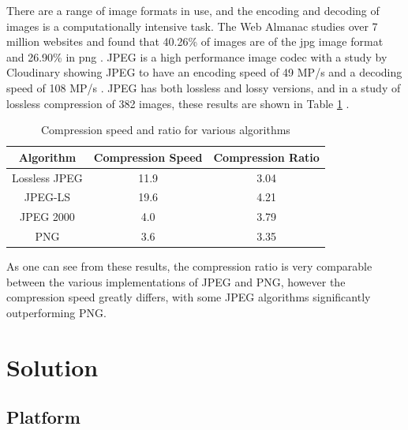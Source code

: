 \documentclass[12pt,a4paper]{article}
\begin{document}
There are a range of image formats in use, and the encoding and decoding of images is a computationally intensive task. The Web Almanac studies over 7 million websites and found that 40.26\% of images are of the jpg image format and 26.90\% in png \cite{webalmanac}. JPEG is a high performance image codec with a study by Cloudinary showing JPEG to have an encoding speed of 49 MP/s and a decoding speed of 108 MP/s \cite{cloudinary}. JPEG has both lossless and lossy versions, and in a study of lossless compression of 382 images, these results are shown in Table \ref{speedratio} \cite{ukrit2011survey}.


\begin{table}[H]
    \centering
    \caption{Compression speed and ratio for various algorithms}
    \vspace*{6pt}
    \label{speedratio}
    \begin{tabular}{ccc}\hline\hline
        Algorithm     & Compression Speed & Compression Ratio \\ \hline
        Lossless JPEG & 11.9              & 3.04              \\
        JPEG-LS       & 19.6              & 4.21              \\
        JPEG 2000     & 4.0               & 3.79              \\
        PNG           & 3.6               & 3.35              \\
    \end{tabular}
\end{table}

As one can see from these results, the compression ratio is very comparable between the various implementations of JPEG and PNG, however the compression speed greatly differs, with some JPEG algorithms significantly outperforming PNG.


\section{Solution}

\subsection{Platform}
\end{document}
